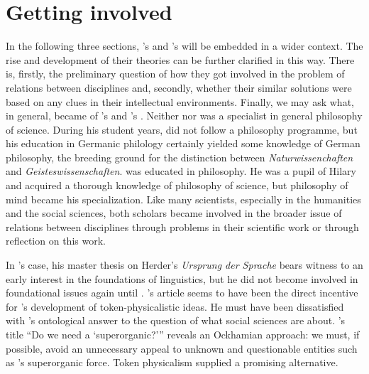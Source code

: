 \documentclass[output=paper]{langscibook}
\begin{document}
\section{Getting involved}
\label{sec:elffers:gettinginvolved}

In the following three sections, {\Sapir}'s and {\Fodor}'s  will be embedded in a wider context. The rise and development of their theories can be further clarified in this way. There is, firstly, the preliminary question of how they got involved in the problem of relations between disciplines and, secondly, whether their similar solutions were based on any clues in their intellectual environments. Finally, we may ask what, in general, became of {\Sapir}'s and {\Fodor}'s . Neither {\Sapir} nor {\Fodor} was a specialist in general philosophy of science. During his student years, {\Sapir} did not follow a philosophy programme, but his education in Germanic philology certainly yielded some knowledge of German philosophy, the breeding ground for the distinction between \emph{Naturwissenchaften} and \emph{Geisteswissenschaften}. {\Fodor} was educated in philosophy. He was a pupil of Hilary {\Putnam} and acquired a thorough knowledge of philosophy of science, but philosophy of mind became his specialization. Like many scientists, especially in the humanities and the social sciences, both scholars became involved in the broader issue of relations between disciplines through problems in their scientific work or through reflection on this work.

In {\Sapir}'s case, his master thesis on Herder's \emph{Ursprung der Sprache} \citep{Sapir1907} bears witness to an early interest in the foundations of linguistics, but he did not become involved in foundational issues again until \citeyear{Sapir1917}. {\Kroeber}'s article seems to have been the direct incentive for {\Sapir}'s development of token-physicalistic ideas. He must have been dissatisfied with {\Kroeber}'s ontological answer to the question of what social sciences are about. {\Sapir}'s title ``Do we need a `superorganic?'\thinspace'' reveals an Ockhamian approach: we must, if possible, avoid an unnecessary appeal to unknown and questionable entities such as {\Kroeber}'s superorganic force. Token physicalism supplied a promising alternative.
\end{document}
